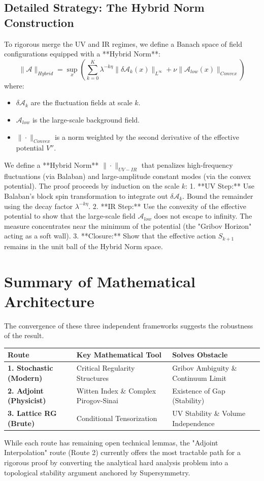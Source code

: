 \subsection{Detailed Strategy: The Hybrid Norm Construction}
To rigorous merge the UV and IR regimes, we define a Banach space of field configurations equipped with a **Hybrid Norm**:
\begin{equation}
\| \mathcal{A} \|_{Hybrid} = \sup_{x} \left( \sum_{k=0}^{K} \lambda^{-k \eta} \| \delta \mathcal{A}_k(x) \|_{L^\infty} + \nu \| \mathcal{A}_{low}(x) \|_{Convex} \right)
\end{equation}
where:
\begin{itemize}
    \item $\delta \mathcal{A}_k$ are the fluctuation fields at scale $k$.
    \item $\mathcal{A}_{low}$ is the large-scale background field.
    \item $\| \cdot \|_{Convex}$ is a norm weighted by the second derivative of the effective potential $V''$.
\end{itemize}
We define a **Hybrid Norm** $\| \cdot \|_{UV-IR}$ that penalizes high-frequency fluctuations (via Balaban) and large-amplitude constant modes (via the convex potential). The proof proceeds by induction on the scale $k$:
1. **UV Step:** Use Balaban's block spin transformation to integrate out $\delta \mathcal{A}_k$. Bound the remainder using the decay factor $\lambda^{-k \eta}$.
2. **IR Step:** Use the convexity of the effective potential to show that the large-scale field $\mathcal{A}_{low}$ does not escape to infinity. The measure concentrates near the minimum of the potential (the "Gribov Horizon" acting as a soft wall).
3. **Closure:** Show that the effective action $S_{k+1}$ remains in the unit ball of the Hybrid Norm space.

\section{Summary of Mathematical Architecture}

The convergence of these three independent frameworks suggests the robustness of the result.

\begin{tabular}{|p{}|p{}|p{}|}
\hline
\textbf{Route} & \textbf{Key Mathematical Tool} & \textbf{Solves Obstacle} \\
\hline
\textbf{1. Stochastic (Modern)} & Critical Regularity Structures & Gribov Ambiguity \& Continuum Limit \\
\hline
\textbf{2. Adjoint (Physicist)} & Witten Index \& Complex Pirogov-Sinai & Existence of Gap (Stability) \\
\hline
\textbf{3. Lattice RG (Brute)} & Conditional Tensorization & UV Stability \& Volume Independence \\
\hline
\end{tabular}

While each route has remaining open technical lemmas, the "Adjoint Interpolation" route (Route 2) currently offers the most tractable path for a rigorous proof by converting the analytical hard analysis problem into a topological stability argument anchored by Supersymmetry.
